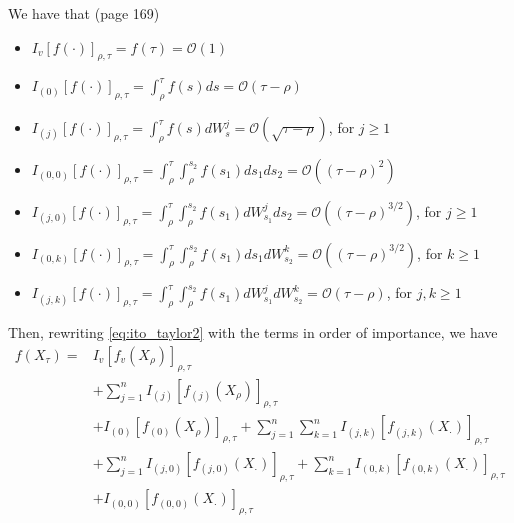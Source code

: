 \documentclass[12pt]{article}
\begin{document}
We have that (page 169)
\begin{itemize}
\item $I_v [f(\cdot)]_{\rho, \tau} = f(\tau) = \mathcal{O}(1)$
\item $I_{(0)} [f(\cdot)]_{\rho, \tau} = \int_{\rho}^{\tau} f(s) ds = \mathcal{O}(\tau - \rho)$
\item $I_{(j)} [f(\cdot)]_{\rho, \tau} = \int_{\rho}^{\tau} f(s) dW_s^j = \mathcal{O}(\sqrt{\tau - \rho})$, for $j \ge 1$
\item $I_{(0,0)} [f(\cdot)]_{\rho, \tau} = \int_{\rho}^{\tau} \int_{\rho}^{s_2} f(s_1) ds_1 ds_2 = \mathcal{O}((\tau - \rho)^2)$
\item $I_{(j,0)} [f(\cdot)]_{\rho, \tau} = \int_{\rho}^{\tau} \int_{\rho}^{s_2} f(s_1) dW_{s_1}^j ds_2 = \mathcal{O}((\tau - \rho)^{3/2})$, for $j \ge 1$
\item $I_{(0,k)} [f(\cdot)]_{\rho, \tau} = \int_{\rho}^{\tau} \int_{\rho}^{s_2} f(s_1) ds_1 dW_{s_2}^k = \mathcal{O}((\tau - \rho)^{3/2})$, for $k \ge 1$
\item $I_{(j,k)} [f(\cdot)]_{\rho, \tau} = \int_{\rho}^{\tau} \int_{\rho}^{s_2} f(s_1) dW_{s_1}^j dW_{s_2}^k = \mathcal{O}(\tau - \rho)$, for $j, k \ge 1$
\end{itemize}

Then, rewriting \eqref{eq:ito_taylor2} with the terms in order of importance, we have
\begin{equation} \label{eq:ito_taylor_sorted}
\begin{aligned}
f( X_\tau) =& I_{v} [f_{v} ( X_\rho)]_{\rho, \tau}  \\
&+ \sum_{j=1}^n I_{(j)} [f_{(j)}( X_\rho)]_{\rho, \tau} \\ &
+ I_{(0)} [f_{(0)}( X_\rho)]_{\rho, \tau} 
+ \sum_{j=1}^n \sum_{k=1}^n I_{(j,k)} [f_{(j,k)} ( X_\cdot)]_{\rho, \tau} \\
& + \sum_{j=1}^n I_{(j,0)} [f_{(j,0)} ( X_\cdot)]_{\rho, \tau} 
+ \sum_{k=1}^n  I_{(0,k)} [f_{(0,k)} ( X_\cdot)]_{\rho, \tau} \\
& + I_{(0,0)} [f_{(0,0)} ( X_\cdot)]_{\rho, \tau} 
\end{aligned}
\end{equation}
\end{document}
